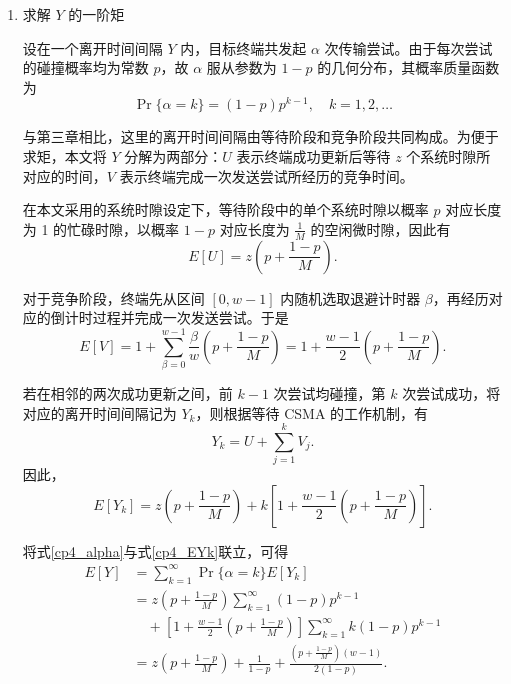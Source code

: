\begin{enumerate}[wide]
    \item 求解 $Y$ 的一阶矩

    设在一个离开时间间隔 $Y$ 内，目标终端共发起 $\alpha$ 次传输尝试。由于每次尝试的碰撞概率均为常数 $p$，故 $\alpha$ 服从参数为 $1-p$ 的几何分布，其概率质量函数为
    \begin{equation}\label{cp4_alpha}
        \Pr\{\alpha=k\}=(1-p)p^{k-1}, \quad k=1,2,\dots
    \end{equation}

    与第三章相比，这里的离开时间间隔由等待阶段和竞争阶段共同构成。为便于求矩，本文将 $Y$ 分解为两部分：$U$ 表示终端成功更新后等待 $z$ 个系统时隙所对应的时间，$V$ 表示终端完成一次发送尝试所经历的竞争时间。

    在本文采用的系统时隙设定下，等待阶段中的单个系统时隙以概率 $p$ 对应长度为 1 的忙碌时隙，以概率 $1-p$ 对应长度为 $\frac{1}{M}$ 的空闲微时隙，因此有
    \begin{equation}\label{cp4_EU}
        E[U] = z\left(p+\frac{1-p}{M}\right).
    \end{equation}

    对于竞争阶段，终端先从区间 $[0,w-1]$ 内随机选取退避计时器 $\beta$，再经历对应的倒计时过程并完成一次发送尝试。于是
    \begin{equation}\label{cp4_EV}
        E[V] = 1 + \sum_{\beta=0}^{w-1}\frac{\beta}{w}\left(p+\frac{1-p}{M}\right)
        = 1+\frac{w-1}{2}\left(p+\frac{1-p}{M}\right).
    \end{equation}

    若在相邻的两次成功更新之间，前 $k-1$ 次尝试均碰撞，第 $k$ 次尝试成功，将对应的离开时间间隔记为 $Y_k$，则根据等待 CSMA 的工作机制，有
    \begin{equation}\label{cp4_Yk_expression}
        Y_k = U+\sum_{j=1}^{k}V_j.
    \end{equation}
    因此，
    \begin{equation}\label{cp4_EYk}
        E[Y_k] = z \left( p + \frac{1-p}{M} \right) + k \left[ 1 + \frac{w-1}{2} \left( p + \frac{1-p}{M} \right) \right].
    \end{equation}

    将式\eqref{cp4_alpha}与式\eqref{cp4_EYk}联立，可得
    \begin{equation}\label{cp4_EY}
        \begin{aligned}
        E[Y] &= \sum_{k=1}^{\infty} \Pr\{\alpha = k\} E[Y_k] \\
        &= z \left( p + \frac{1-p}{M} \right) \sum_{k=1}^{\infty} (1-p) p^{k-1} \\
        &\quad + \left[ 1 + \frac{w-1}{2} \left( p + \frac{1-p}{M} \right) \right] \sum_{k=1}^{\infty} k (1-p) p^{k-1} \\
        &= z \left( p + \frac{1-p}{M} \right) + \frac{1}{1-p} + \frac{\left( p + \frac{1-p}{M} \right) (w-1)}{2(1-p)}.
        \end{aligned}
    \end{equation}


\end{enumerate}
